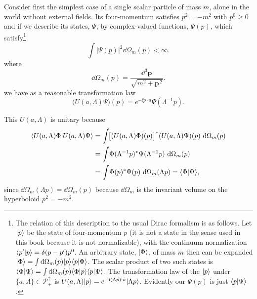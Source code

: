 Consider first the simplest case of a single scalar particle of mass $m$, alone
in the world without external fields. Its four-momentum satisfies
$p^2=-m^2$ with $p^0\geq 0$ and if we describe its states, $\Psi$, by
complex-valued functions, $\Psi(p)$, which satisfy\footnote{%
The relation of this description to the usual Dirac formalism is as follows.
Let $\lvert p\rangle$ be the state of four-momentum $p$ (it is not a state in the sense
used in this book because it is not normalizable), with the continuum
normalization $\langle p'\vert p\rangle=\delta(p-p')p^0$. An arbitrary state, $\lvert \Phi\rangle$,
of mass $m$ then can be expanded
$\lvert \Phi\rangle=\int \mathop{}\!\mathrm{d}\Omega_m(p)\lvert p\rangle\langle p\vert \Phi\rangle$. The scalar product
of two such states is $\langle \Phi\vert \Psi\rangle=\int \mathop{}\!\mathrm{d}\Omega_m(p)
\langle \Phi\vert p\rangle\langle p\vert \Psi\rangle$. The transformation law of the $\lvert p\rangle$
under $\{a,\Lambda\}\in\mathcal{P}^{\uparrow}_{+}$ is
$U(a,\Lambda)\lvert p\rangle=e^{-\mathrm{i}(\Lambda p)\cdot a}\lvert \Lambda p\rangle$.
Evidently our $\Psi(p)$ is just $\langle p\vert \Psi\rangle$.
}%
\begin{equation*}
  \int\!\left|\Psi(p)\right|^2\dd\Omega_m(p)<\infty.
\end{equation*}
where
\begin{equation}
  \dd\Omega_m(p)=\frac{\dd^3\mathbf{p}}{\sqrt{m^2+\mathbf{p}^{\,2}}}.
  \tag{1-55}\label{eq:1-55}
\end{equation}
we have as a reasonable transformation law
\begin{equation}
  \bigl(U(a,\Lambda)\Psi\bigr)(p)
  =e^{-\ii p\cdot a}\Psi(\Lambda^{-1}p).
  \tag{1-56}\label{eq:1-56}
\end{equation}

This $U(a,\Lambda)$ is unitary because
\begin{equation*}
\begin{aligned}
  \langle U(a,\Lambda)\Phi\vert U(a,\Lambda)\Psi\rangle
  &=\int\!\bigl[(U(a,\Lambda)\Phi)(p)\bigr]^*
      (U(a,\Lambda)\Psi)(p)\,\mathop{}\!\mathrm{d}\Omega_m(p)\\
  &=\int\!\Phi(\Lambda^{-1}p)^*\Psi(\Lambda^{-1}p)\,\mathop{}\!\mathrm{d}\Omega_m(p)\\
  &=\int\!\Phi(p)^*\Psi(p)\,\mathop{}\!\mathrm{d}\Omega_m(\Lambda p)
   =\langle \Phi\vert \Psi\rangle,
\end{aligned}
\end{equation*}
since $\dd\Omega_m(\Lambda p)=\dd\Omega_m(p)$ because $\dd\Omega_m$ is the invariant
volume on the hyperboloid $p^2=-m^2$.

